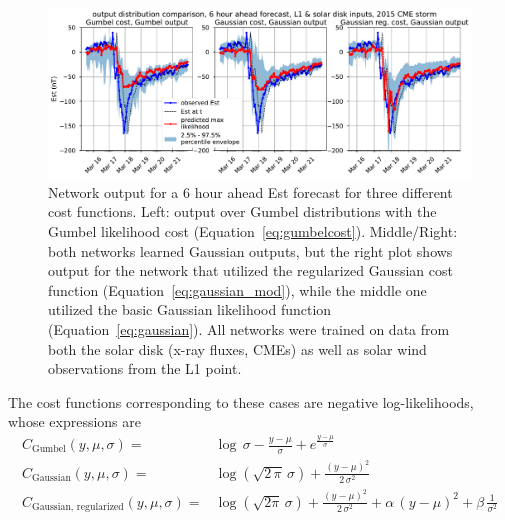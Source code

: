 \documentclass{agujournal2018}
\begin{document}
\begin{figure}[htbp]
  \centering
  \includegraphics[width=1.0\textwidth]{figures/supplement/est_forecast_distcompare_storm4.pdf} 
  \caption{Network output for a 6 hour ahead Est forecast for three different cost functions. Left: output over Gumbel distributions with the Gumbel likelihood cost (Equation~\ref{eq:gumbelcost}). Middle/Right: both networks learned Gaussian outputs, but the right plot shows output for the network that utilized the regularized Gaussian cost function (Equation~\ref{eq:gaussian_mod}), while the middle one utilized the basic Gaussian likelihood function (Equation~\ref{eq:gaussian}). All networks were trained on data from both the solar disk (x-ray fluxes, CMEs) as well as solar wind observations from the L1 point.}
  \label{fig:storm4_forecast}
\end{figure}

The cost functions corresponding to these cases are negative log-likelihoods, whose expressions are
\begin{eqnarray}
	C_{\mathrm{Gumbel}}(y, \mu, \sigma) =& \log\,\sigma - \frac{y-\mu}{\sigma} + e^{\frac{y-\mu}{\sigma}} \label{eq:gumbelcost} \\
	C_{\mathrm{Gaussian}}(y, \mu, \sigma) =& \log\left(\sqrt{2\,\pi}\,\sigma \right) + \frac{\left(y-\mu \right)^2}{2\,\sigma^2} \label{eq:gaussian}\\
	C_{\mathrm{Gaussian,\, regularized}}(y, \mu, \sigma) =& \log\left(\sqrt{2\pi}\,\sigma \right) + \frac{\left(y-\mu \right)^2}{2\,\sigma^2} +  \alpha\,\left(y-\mu \right)^2 + \beta\,\frac{1}{\sigma^2} \label{eq:gaussian_mod}
\end{eqnarray}
\end{document}
